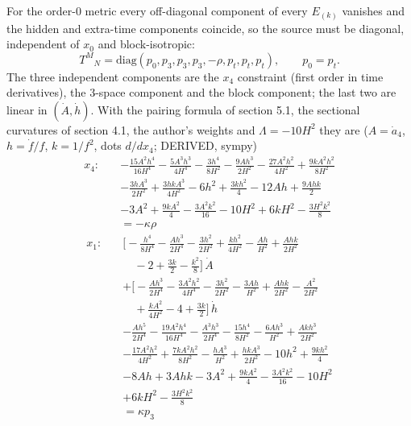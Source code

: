 \documentclass[
  10pt,
]{article}
\begin{document}
For the order-0 metric every off-diagonal component of every \(E_{(k)}\)
vanishes and the hidden and extra-time components coincide, so the
source must be diagonal, independent of \(x_0\) and block-isotropic:
\[ T^M{}_N = \mathrm{diag}(p_0, p_3, p_3, p_3, -\rho, p_t, p_t, p_t),\qquad p_0 = p_t. \]
The three independent components are the \(x_4\) constraint (first order
in time derivatives), the 3-space component and the block component; the
last two are linear in \((\dot A, \dot h)\). With the pairing formula of
section 5.1, the sectional curvatures of section 4.1, the author's
weights and \(\Lambda = -10H^2\) they are (\(A = \dot a_4\),
\(h = \dot f/f\), \(k = 1/f^2\), dots \(d/dx_4\); DERIVED, sympy)
\[ \begin{aligned} x_4:\quad &- \frac{15 A^{2} h^{4}}{16 H^{4}} - \frac{5 A^{3} h^{3}}{4 H^{4}} - \frac{3 h^{4}}{8 H^{2}} - \frac{9 A h^{3}}{2 H^{2}} - \frac{27 A^{2} h^{2}}{4 H^{2}} + \frac{9 k A^{2} h^{2}}{8 H^{2}} \\
   &- \frac{3 h A^{3}}{2 H^{2}} + \frac{3 h k A^{3}}{4 H^{2}} - 6 h^{2} + \frac{3 k h^{2}}{4} - 12 A h + \frac{9 A h k}{2} \\
   &- 3 A^{2} + \frac{9 k A^{2}}{4} - \frac{3 A^{2} k^{2}}{16} - 10 H^{2} + 6 k H^{2} - \frac{3 H^{2} k^{2}}{8} \\
   &= -\kappa\rho \end{aligned} \]
\[ \begin{aligned} x_1:\quad &\Big[- \frac{h^{4}}{8 H^{4}} - \frac{A h^{3}}{2 H^{4}} - \frac{3 h^{2}}{2 H^{2}} + \frac{k h^{2}}{4 H^{2}} - \frac{A h}{H^{2}} + \frac{A h k}{2 H^{2}} \\
   &\quad -2 + \frac{3 k}{2} - \frac{k^{2}}{8}\Big]\,\dot A \\
   &+ \Big[- \frac{A h^{3}}{2 H^{4}} - \frac{3 A^{2} h^{2}}{4 H^{4}} - \frac{3 h^{2}}{2 H^{2}} - \frac{3 A h}{H^{2}} + \frac{A h k}{2 H^{2}} - \frac{A^{2}}{2 H^{2}} \\
   &\quad + \frac{k A^{2}}{4 H^{2}} - 4 + \frac{3 k}{2}\Big]\,\dot h \\
   &- \frac{A h^{5}}{2 H^{4}} - \frac{19 A^{2} h^{4}}{16 H^{4}} - \frac{A^{3} h^{3}}{2 H^{4}} - \frac{15 h^{4}}{8 H^{2}} - \frac{6 A h^{3}}{H^{2}} + \frac{A k h^{3}}{2 H^{2}} \\
   &- \frac{17 A^{2} h^{2}}{4 H^{2}} + \frac{7 k A^{2} h^{2}}{8 H^{2}} - \frac{h A^{3}}{H^{2}} + \frac{h k A^{3}}{2 H^{2}} - 10 h^{2} + \frac{9 k h^{2}}{4} \\
   &- 8 A h + 3 A h k - 3 A^{2} + \frac{9 k A^{2}}{4} - \frac{3 A^{2} k^{2}}{16} - 10 H^{2} \\
   &+ 6 k H^{2} - \frac{3 H^{2} k^{2}}{8} \\
   &= \kappa p_3 \end{aligned} \]
\end{document}
